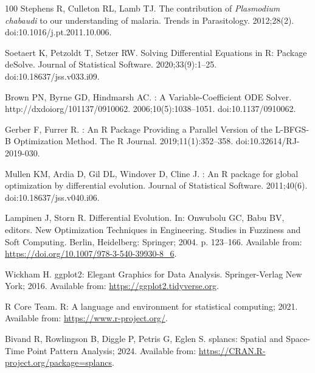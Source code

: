 \documentclass[10pt,letterpaper]{article}
\begin{document}
\begin{thebibliography}{100}
Stephens R, Culleton RL, Lamb TJ.
\newblock The contribution of \textit{{Plasmodium} chabaudi} to our understanding of malaria.
\newblock Trends in Parasitology. 2012;28(2).
\newblock doi:{10.1016/j.pt.2011.10.006}.

Soetaert K, Petzoldt T, Setzer RW.
\newblock Solving {Differential} {Equations} in {R}: {Package} {deSolve}.
\newblock Journal of Statistical Software. 2020;33(9):1--25.
\newblock doi:{10.18637/jss.v033.i09}.

Brown PN, Byrne GD, Hindmarsh AC.
: {A} {Variable}-{Coefficient} {ODE} {Solver}.
\newblock http://dxdoiorg/101137/0910062. 2006;10(5):1038--1051.
\newblock doi:{10.1137/0910062}.

Gerber F, Furrer R.
: {An} {R} {Package} {Providing} a {Parallel} {Version} of the {L}-{BFGS}-{B} {Optimization} {Method}.
\newblock The R Journal. 2019;11(1):352--358.
\newblock doi:{10.32614/RJ-2019-030}.

Mullen KM, Ardia D, Gil DL, Windover D, Cline J.
: {An} {R} package for global optimization by differential evolution.
\newblock Journal of Statistical Software. 2011;40(6).
\newblock doi:{10.18637/jss.v040.i06}.

Lampinen J, Storn R.
\newblock Differential {Evolution}.
\newblock In: Onwubolu GC, Babu BV, editors. New {Optimization} {Techniques} in {Engineering}. Studies in {Fuzziness} and {Soft} {Computing}. Berlin, Heidelberg: Springer; 2004. p. 123--166.
\newblock Available from: \url{https://doi.org/10.1007/978-3-540-39930-8_6}.

Wickham H.
\newblock ggplot2: {Elegant} {Graphics} for {Data} {Analysis}.
\newblock Springer-Verlag New York; 2016.
\newblock Available from: \url{https://ggplot2.tidyverse.org}.

{R Core Team}. R: {A} language and environment for statistical computing; 2021.
\newblock Available from: \url{https://www.r-project.org/}.

Bivand R, Rowlingson B, Diggle P, Petris G, Eglen S. splancs: {Spatial} and {Space}-{Time} {Point} {Pattern} {Analysis}; 2024.
\newblock Available from: \url{https://CRAN.R-project.org/package=splancs}.

\end{thebibliography}
\end{document}
